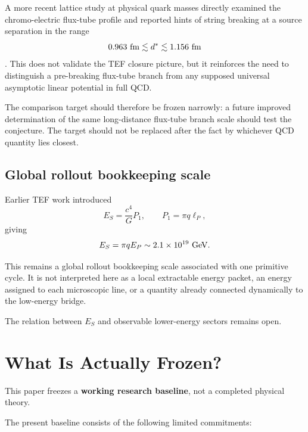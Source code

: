 \documentclass[10pt]{article}
\begin{document}
A more recent lattice study at physical quark masses directly examined the chromo-electric flux-tube profile and reported hints of string breaking at a source separation in the range \[
0.963\ {\rm fm}\lesssim d^*\lesssim1.156\ {\rm fm}
\] \cite{Cea2026}. This does not validate the TEF closure picture, but it reinforces the need to distinguish a pre-breaking flux-tube branch from any supposed universal asymptotic linear potential in full QCD.

The comparison target should therefore be frozen narrowly: a future improved determination of the same long-distance flux-tube branch scale should test the conjecture. The target should not be replaced after the fact by whichever QCD quantity lies closest.

\subsection{Global rollout bookkeeping scale}\label{global-rollout-bookkeeping-scale}

Earlier TEF work introduced \[
E_S=\frac{c^4}{G}P_1,
\qquad
P_1=\pi q\ell_P,
\] giving \[
E_S=\pi qE_P
\sim2.1\times10^{19}\ {\rm GeV}.
\]

This remains a global rollout bookkeeping scale associated with one primitive cycle. It is not interpreted here as a local extractable energy packet, an energy assigned to each microscopic line, or a quantity already connected dynamically to the low-energy bridge.

The relation between \(E_S\) and observable lower-energy sectors remains open.

\section{What Is Actually Frozen?}\label{what-is-actually-frozen}

This paper freezes a \textbf{working research baseline}, not a completed physical theory.

The present baseline consists of the following limited commitments:
\end{document}
